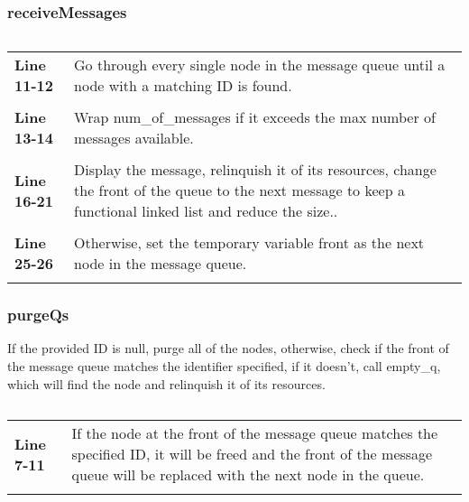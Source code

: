 \documentclass[a4paper, 12pt, titlepage]{article}
\newenvironment{code}{\captionsetup{type=listing}}{}
\newcommand{\sourcecode}[3]{
    \begin{code}
      \inputminted[linenos,numbersep=5pt,gobble=0,frame=lines,framesep=2mm,]{c}{#1}
        \caption{#2}
        \label{lst: #3}
    \end{code}
}
\begin{document}
\begin{onehalfspacing}
\begin{longtable}{l p{10cm}}
   \end{longtable}


   \subsubsection{receiveMessages}

   \sourcecode{snippets/task2b/receiveMessages.c}{receiveMessages method implementation}{task2b_receiveMessages}

   \begin{longtable}{l p{10cm}}
      \textbf{Line 11-12} & Go through every single node in the message queue until a node with a matching ID is found. \\ \\
      \textbf{Line 13-14} & Wrap num\_of\_messages if it exceeds the max number of messages available. \\ \\
      \textbf{Line 16-21} & Display the message, relinquish it of its resources, change the front of the queue to the next message to keep a functional linked list and reduce the size.. \\ \\
      \textbf{Line 25-26} & Otherwise, set the temporary variable front as the next node in the message queue. \\ \\
   \end{longtable}
   \subsubsection{purgeQs}
   If the provided ID is null, purge all of the nodes, otherwise, check if the front of the message queue matches the identifier specified, if it doesn't, call empty\_q, which will find the node and relinquish it of its resources.
   \sourcecode{snippets/task2b/purgeQs.c}{purgeQs method implementation}{task2b_purgeQs}

   \begin{longtable}{l p{10cm}}
     \textbf{Line 7-11} & If the node at the front of the message queue matches the specified ID, it will be freed and the front of the message queue will be replaced with the next node in the queue. \\ \\
   \end{longtable}


    \sourcecode{snippets/task2b/empty_all_qs.c}{empty\_all\_qs helper function}{empty_all_qs}


\end{onehalfspacing}
\end{document}
